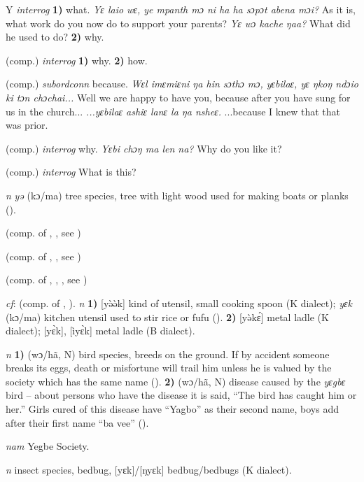\begin{letter}{Y}
 \textit{interrog} \textbf{1)} what. \textit{Yɛ laio wɛ, ye mpanth mɔ ni ha ha sɔpɔt abena mɔi?} As it is, what work do you now do to support your parents? \textit{Yɛ wɔ kache ŋaa?} What did he used to do? \textbf{2)} why.

 (comp.) \textit{interrog} \textbf{1)} why. \textbf{2)} how.

 (comp.) \textit{subordconn} because. \textit{Wɛl imɛmiɛni ŋa hin sɔthɔ mɔ, yɛbilaɛ, yɛ ŋkoŋ ndɔio ki tɔn chɔchai...} Well we are happy to have you, because after you have sung for us in the church... \textit{...yɛbilaɛ ashiɛ lanɛ la ŋa nsheɛ.} ...because I knew that that was prior.

 (comp.) \textit{interrog} why. \textit{Yɛbi chɔŋ ma len na?} Why do you like it?

 (comp.) \textit{interrog} What is this?

 \textit{n} \textit{yə} (kɔ/ma) tree species, tree with light wood used for making boats or planks (\citealt{Pichl1967}). 

 (comp. of , , see ) 

 (comp. of , , see ) 

 (comp. of , , , see ) 

 \textit{cf}:  (comp. of , ). \textit{n} \textbf{1)} [yə̀ə̀k] kind of utensil, small cooking spoon (K dialect); \textit{yɛk} (kɔ/ma) kitchen utensil used to stir rice or fufu (\citealt{Pichl1967}). \textbf{2)} [yə̀kɛ́] metal ladle (K dialect); [yɛ̀k], [ìyɛ̀k] metal ladle (B dialect). 

 \textit{n} \textbf{1)} (wɔ/hã, N) bird species, breeds on the ground. If by accident someone breaks its eggs, death or misfortune will trail him unless he is valued by the society which has the same name (\citealt{Pichl1967}). \textbf{2)} (wɔ/hã, N) disease caused by the \textit{yɛgbɛ} bird – about persons who have the disease it is said, “The bird has caught him or her.” Girls cured of this disease have “Yagbo” as their second name, boys add after their first name “ba vee” (\citealt{Pichl1967}). 

 \textit{nam} Yegbe Society.

 \textit{n} insect species, bedbug, [yɛk]/[ŋyɛk] bedbug/bedbugs (K dialect).


\end{letter}
